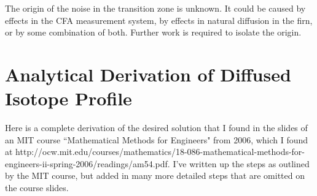 \documentclass[draft, jgrga]{AGUTeX}
\begin{document}
\begin{article}
The origin of the noise in the transition zone is unknown. It could be caused by effects in the CFA measurement system, by effects in natural diffusion in the firn, or by some combination of both. Further work is required to isolate the origin.





\appendix

\section{Analytical Derivation of Diffused Isotope Profile}

Here is a complete derivation of the desired solution that I found in the slides of an MIT course ``Mathematical Methods for Engineers" from 2006, which I found at http://ocw.mit.edu/courses/mathematics/18-086-mathematical-methods-for-engineers-ii-spring-2006/readings/am54.pdf. I've written up the steps as outlined by the MIT course, but added in many more detailed steps that are omitted on the course slides.\\


\end{article}
\end{document}
